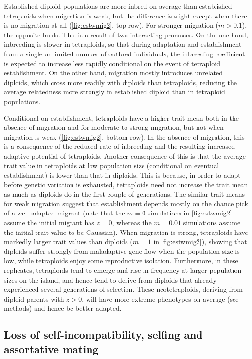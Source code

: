 \documentclass[12pt,a4paper]{article}
\begin{document}
Established diploid populations are more inbred on average than established
tetraploids when migration is weak, but the difference is slight except when
there is no migration at all (\cref{fig:estwmig2}, top row).
For stronger migration ($m > 0.1$), the opposite holds.
This is a result of two interacting processes.
On the one hand, inbreeding is slower in tetraploids, so that during adaptation
and establishment from a single or limited number of outbred individuals, 
the inbreeding coefficient is expected to increase less rapidly conditional on
the event of tetraploid establishment.
On the other hand, migration mostly introduces unrelated diploids, which cross
more readily with diploids than tetraploids, reducing the average relatedness
more strongly in established diploid than in tetraploid populations.

Conditional on establishment, tetraploids have a higher trait mean both in the
absence of migration and for moderate to strong migration, but not when
migration is weak (\cref{fig:estwmig2}, bottom row).
In the absence of migration, this is a consequence of the reduced rate of
inbreeding and the resulting increased adaptive potential of tetraploids.
Another consequence of this is that the average trait value in tetraploids at
low population size (conditional on eventual establishment) is lower than that
in diploids.
This is because, in order to adapt before genetic variation is exhausted,
tetraploids need not increase the trait mean as much as diploids do in the
first couple of generations.
The similar trait means for weak migration suggest that establishment depends
mostly on the chance pick of a well-adapted migrant (note that the $m=0$
simulations in \cref{fig:estwmig2} assume the initial migrant has $z=0$,
whereas the $m=0.01$ simulations assume the initial trait value to be
Gaussian).
When migration is strong, tetraploids have markedly larger trait values
than diploids ($m=1$ in \cref{fig:estwmig2}), showing that diploids suffer
strongly from maladaptive gene flow when the population size is low, while
tetraploids enjoy some reproductive isolation.
Furthermore, in these replicates, tetraploids tend to emerge and rise in
frequency at larger population sizes on the island, and hence tend to derive
from diploids that already experienced several generations of selection.
These neotetraploids, deriving from diploid parents with $z>0$, will have more
extreme phenotypes on average (see methods) and hence be better adapted.


\subsection*{Loss of self-incompatibility, selfing and assortative mating}
\end{document}
